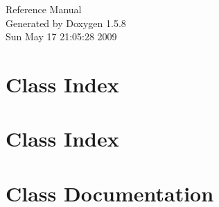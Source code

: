 \documentclass[a4paper]{book}
\begin{document}
\begin{titlepage}
\vspace*{7cm}
\begin{center}
{\Large Reference Manual}\\
\vspace*{1cm}
{\large Generated by Doxygen 1.5.8}\\
\vspace*{0.5cm}
{\small Sun May 17 21:05:28 2009}\\
\end{center}
\end{titlepage}
\clearemptydoublepage
{}
\tableofcontents
\clearemptydoublepage
{}
\chapter{Class Index}

\chapter{Class Index}

\chapter{Class Documentation}














\printindex
\end{document}
